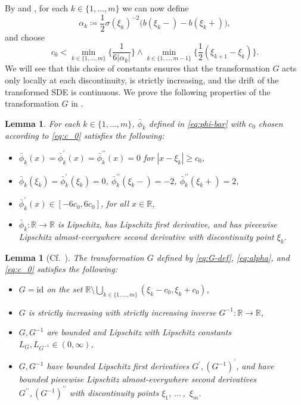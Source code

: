 \documentclass[onseside, final]{amsart}
\newtheorem{lemma}[theorem]{Lemma}
\theoremstyle{definition}
\newcommand{\R}{\mathbb R}
\newcommand{\id}{\mathrm{id}}
\newcommand{\continuityset}{\R \setminus \bigcup_{k \in \{1, \dotsc, m\}}(\xi_k - c_0, \xi_k + c_0)}
\numberwithin{equation}{section}
\begin{document}
		By  and , for each $k \in \{1, \dotsc, m\}$ we can now define
		\begin{equation}\label{eq:alpha}
			\alpha_k \coloneqq \frac12 \sigma(\xi_k)^{-2}\bigl(b(\xi_k -) - b(\xi_k +)\bigr),
		\end{equation}
		and choose
		\begin{equation}\label{eq:c_0}
			c_0 < \min_{k \in \{1, \dotsc, m\}}\bigg\{\frac{1}{6|\alpha_k|}\bigg\} \wedge \min_{k \in \{1, \dotsc, m - 1\}}\bigg\{\frac 12 (\xi_{k + 1} - \xi_{k})\bigg\}.
		\end{equation}
		We will see that this choice of constants ensures that the transformation $G$ acts only locally at each discontinuity, is strictly increasing, and the drift of the transformed SDE is continuous. We prove the following properties of the transformation $G$ in .
		
		\begin{lemma}\label{lem:phi-bar}
			For each $k \in \{1, \dotsc, m\}$, $\bar \phi_k$ defined in \eqref{eq:phi-bar} with $c_0$ chosen according to \eqref{eq:c_0} satisfies the following:
			\begin{itemize}
				\item $\bar \phi_k(x) = \bar \phi^\prime_k(x) = \bar \phi^{\prime \prime}_k(x) = 0$ for $|x - \xi_k| \geq c_0$,
				\item $\bar \phi_k(\xi_k) = \bar \phi_k^\prime(\xi_k) = 0$, $\bar \phi_k^{\prime \prime}(\xi_k -) = -2$, $\bar \phi_k^{\prime \prime}(\xi_k +) = 2$,
				\item $\bar \phi_k^\prime(x) \in [-6 c_0, 6c_0]$, for all $x \in \R$,
				\item $\bar \phi_k \colon \R \to \R$ is Lipschitz, has Lipschitz first derivative, and has piecewise Lipschitz almost-everywhere second derivative with discontinuity point $\xi_k$.
			\end{itemize}
		\end{lemma}
		
		\begin{lemma}[Cf.~{\citep[Lemma 2.2]{LeSz17}}]\label{lem:G-properties-growth-disc}
			The transformation $G$ defined by \eqref{eq:G-def}, \eqref{eq:alpha}, and \eqref{eq:c_0} satisfies the following:
			\begin{itemize}
				\item $G = \id$ on the set $\continuityset$,
				\item $G$ is strictly increasing with strictly increasing inverse $G^{-1}\colon \R \to \R$,
				\item $G, G^{-1}$ are bounded and Lipschitz with Lipschitz constants $L_G, L_{G^{-1}} \in (0, \infty)$,
				\item $G, G^{-1}$ have bounded Lipschitz first derivatives $G^\prime, (G^{-1})^\prime$, and have bounded piecewise Lipschitz almost-everywhere second derivatives $G^{\prime \prime}, (G^{-1})^{\prime \prime}$ with discontinuity points $\xi_1$, $\dotsc\,$,~$\xi_m$.
			\end{itemize}
		\end{lemma}
		
\end{document}
